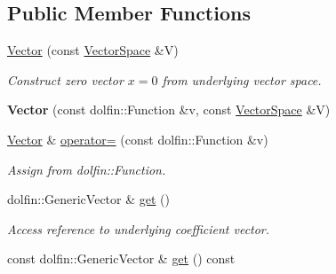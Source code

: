 \subsection*{Public Member Functions}
\begin{DoxyCompactItemize}
\item 
\hypertarget{classSpacy_1_1FEniCS_1_1Vector_af6ea1ceb6c0b01cf10b3ab9caa6f1eda}{\hyperlink{classSpacy_1_1FEniCS_1_1Vector_af6ea1ceb6c0b01cf10b3ab9caa6f1eda}{Vector} (const \hyperlink{classSpacy_1_1VectorSpace}{Vector\-Space} \&V)}\label{classSpacy_1_1FEniCS_1_1Vector_af6ea1ceb6c0b01cf10b3ab9caa6f1eda}

\begin{DoxyCompactList}\small\item\em Construct zero vector $x=0$ from underlying vector space. \end{DoxyCompactList}\item 
\hypertarget{classSpacy_1_1FEniCS_1_1Vector_a2c13b8edce95768e3710ae97a4466242}{{\bfseries Vector} (const dolfin\-::\-Function \&v, const \hyperlink{classSpacy_1_1VectorSpace}{Vector\-Space} \&V)}\label{classSpacy_1_1FEniCS_1_1Vector_a2c13b8edce95768e3710ae97a4466242}

\item 
\hypertarget{classSpacy_1_1FEniCS_1_1Vector_ad4d68b813d9374aa83f37ec2b3ad02fc}{\hyperlink{classSpacy_1_1FEniCS_1_1Vector}{Vector} \& \hyperlink{classSpacy_1_1FEniCS_1_1Vector_ad4d68b813d9374aa83f37ec2b3ad02fc}{operator=} (const dolfin\-::\-Function \&v)}\label{classSpacy_1_1FEniCS_1_1Vector_ad4d68b813d9374aa83f37ec2b3ad02fc}

\begin{DoxyCompactList}\small\item\em Assign from dolfin\-::\-Function. \end{DoxyCompactList}\item 
\hypertarget{classSpacy_1_1FEniCS_1_1Vector_afadf508451c68fd767da6a1be4852fed}{dolfin\-::\-Generic\-Vector \& \hyperlink{classSpacy_1_1FEniCS_1_1Vector_afadf508451c68fd767da6a1be4852fed}{get} ()}\label{classSpacy_1_1FEniCS_1_1Vector_afadf508451c68fd767da6a1be4852fed}

\begin{DoxyCompactList}\small\item\em Access reference to underlying coefficient vector. \end{DoxyCompactList}\item 
\hypertarget{classSpacy_1_1FEniCS_1_1Vector_ac69fe18ef6818182186f9db82da0f7e2}{const dolfin\-::\-Generic\-Vector \& \hyperlink{classSpacy_1_1FEniCS_1_1Vector_ac69fe18ef6818182186f9db82da0f7e2}{get} () const }\label{classSpacy_1_1FEniCS_1_1Vector_ac69fe18ef6818182186f9db82da0f7e2}


\end{DoxyCompactItemize}
